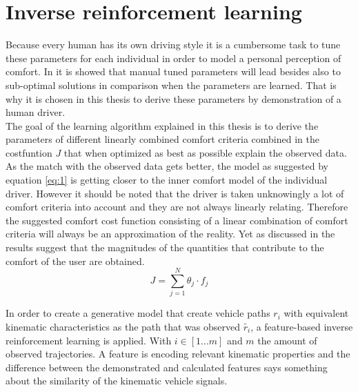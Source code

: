 \section{Inverse reinforcement learning}
Because every human has its own driving style it is a cumbersome task to tune these parameters for each individual in order to model a personal perception of comfort. In \cite{Powers} it is showed that manual tuned parameters will lead besides also to sub-optimal solutions in comparison when the parameters are learned.  That is why it is chosen in this thesis to derive these parameters by demonstration of a human driver.\\

The goal of the learning algorithm explained in this thesis is to derive the parameters of different linearly combined comfort criteria combined in the costfuntion $J$ that when optimized as best as possible explain the observed data. As the match with the observed  data gets better, the model as suggested by equation \ref{eq:1} is getting closer to the inner comfort model of the individual driver. However it should be noted that the driver is taken unknowingly a lot of comfort criteria into account and they are not always linearly relating. Therefore the suggested comfort cost function consisting of a linear combination of comfort criteria will always be an approximation of the reality. Yet as discussed in \cite{Kuderer2015a} the results suggest that the magnitudes of the quantities that contribute to the comfort of the user are obtained.\\

\begin{equation}\label{eq:1}
	J = \sum_{j=1}^{N}\theta_j\cdot f_j	
\end{equation}



In order to create a generative model that create vehicle paths $r_i$ with equivalent kinematic characteristics as the path that was observed $\tilde{r_i}$, a feature-based inverse reinforcement learning is applied. \cite{Kuderer2015a,Abbeel2004} With $i \in [1 ... m]$ and $m$ the amount of observed trajectories. A feature is encoding relevant kinematic properties and the difference between the demonstrated and calculated features says something about the similarity of the kinematic vehicle signals. \\

